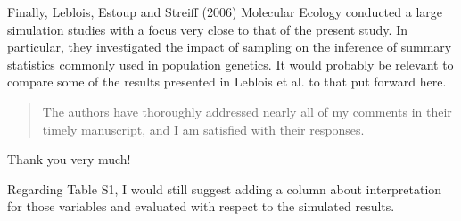 

\begin{point}{}
Finally, Leblois, Estoup and Streiff (2006) Molecular Ecology conducted a large simulation studies with a focus very close to that of the present study. In particular, they investigated the impact of sampling on the inference of summary statistics commonly used in population genetics. It would probably be relevant to compare some of the results presented in Leblois et al. to that put forward here.
\end{point}






\begin{quote}
The authors have thoroughly addressed nearly all of my comments in their timely manuscript, and I am satisfied with their responses.
\end{quote}

Thank you very much!

\begin{point}{}
Regarding Table S1, I would still suggest adding a column about interpretation for those variables and evaluated with respect to the simulated results.
\end{point}



